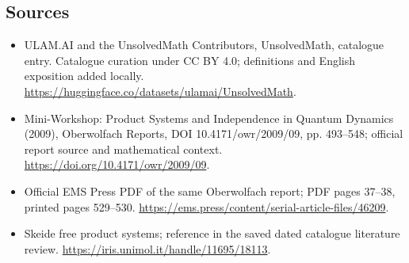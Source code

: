 \documentclass[11pt]{article}
\begin{document}
\subsection{Sources}
\begin{itemize}
\item[\hypertarget{source:statement:1}{S1}] ULAM.AI and the UnsolvedMath Contributors, UnsolvedMath, catalogue entry. Catalogue curation under CC BY 4.0; definitions and English exposition added locally.
\url{https://huggingface.co/datasets/ulamai/UnsolvedMath}.
\item[\hypertarget{source:statement:2}{S2}] Mini-Workshop: Product Systems and Independence in Quantum Dynamics (2009), Oberwolfach Reports, DOI 10.4171/owr/2009/09, pp. 493--548; official report source and mathematical context.
\url{https://doi.org/10.4171/owr/2009/09}.
\item[\hypertarget{source:statement:3}{S3}] Official EMS Press PDF of the same Oberwolfach report; PDF pages 37--38, printed pages 529--530.
\url{https://ems.press/content/serial-article-files/46209}.
\item[\hypertarget{source:statement:4}{S4}] Skeide free product systems; reference in the saved dated catalogue literature review.
\url{https://iris.unimol.it/handle/11695/18113}.
\end{itemize}
\label{end:statement}
\end{document}
